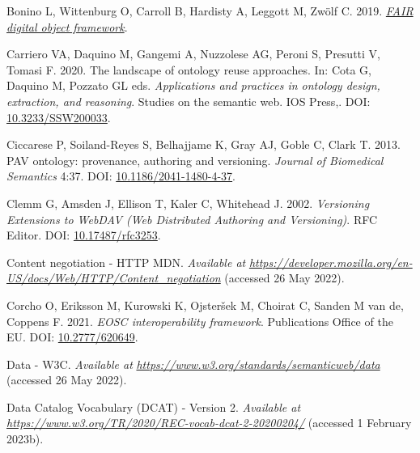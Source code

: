 \begin{CSLReferences}{1}{0}
\leavevmode{}%
Bonino L, Wittenburg O, Carroll B, Hardisty A, Leggott M, Zwölf C. 2019. \emph{\href{https://github.com/GEDE-RDA-Europe/GEDE/blob/master/FAIR\%20Digital\%20Objects/FDOF/FAIR\%20Digital\%20Object\%20Framework-v1-02.docx}{FAIR digital object framework}}.

\leavevmode{}%
Carriero VA, Daquino M, Gangemi A, Nuzzolese AG, Peroni S, Presutti V, Tomasi F. 2020. The landscape of ontology reuse approaches. In: Cota G, Daquino M, Pozzato GL eds. \emph{Applications and practices in ontology design, extraction, and reasoning}. Studies on the semantic web. IOS Press,. DOI: \href{https://doi.org/10.3233/SSW200033}{10.3233/SSW200033}.

\leavevmode{}%
Ciccarese P, Soiland-Reyes S, Belhajjame K, Gray AJ, Goble C, Clark T. 2013. PAV ontology: provenance, authoring and versioning. \emph{Journal of Biomedical Semantics} 4:37. DOI: \href{https://doi.org/10.1186/2041-1480-4-37}{10.1186/2041-1480-4-37}.

\leavevmode{}%
Clemm G, Amsden J, Ellison T, Kaler C, Whitehead J. 2002. \emph{Versioning Extensions to WebDAV (Web Distributed Authoring and Versioning)}. RFC Editor. DOI: \href{https://doi.org/10.17487/rfc3253}{10.17487/rfc3253}.

\leavevmode{}%
Content negotiation - HTTP \textbar{} MDN. \emph{Available at} \href{https://developer.mozilla.org/en-US/docs/Web/HTTP/Content_negotiation}{\emph{https://developer.mozilla.org/en-US/docs/Web/HTTP/Content\_negotiation}} (accessed 26 May 2022).

\leavevmode{}%
Corcho O, Eriksson M, Kurowski K, Ojsteršek M, Choirat C, Sanden M van de, Coppens F. 2021. \emph{EOSC interoperability framework}. Publications Office of the EU. DOI: \href{https://doi.org/10.2777/620649}{10.2777/620649}.

\leavevmode{}%
Data - W3C. \emph{Available at} \href{https://www.w3.org/standards/semanticweb/data}{\emph{https://www.w3.org/standards/semanticweb/data}} (accessed 26 May 2022).

\leavevmode{}%
Data Catalog Vocabulary (DCAT) - Version 2. \emph{Available at} \href{https://www.w3.org/TR/2020/REC-vocab-dcat-2-20200204/}{\emph{https://www.w3.org/TR/2020/REC-vocab-dcat-2-20200204/}} (accessed 1 February 2023b).


\end{CSLReferences}
